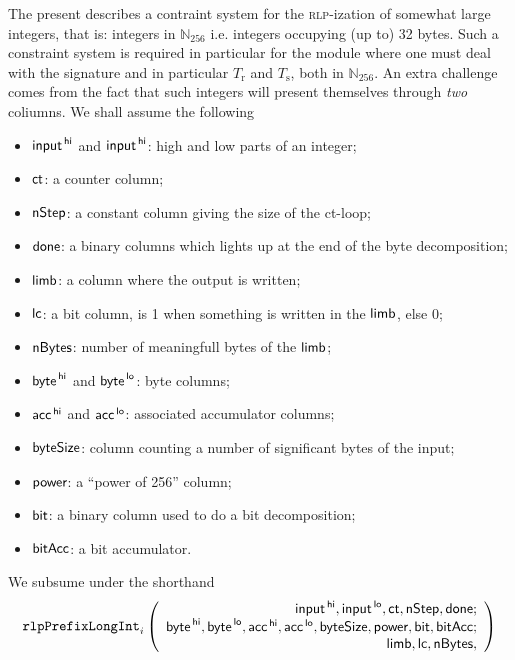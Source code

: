The present describes a contraint system for the \textsc{rlp}-ization of somewhat large integers, that is: integers in $\mathbb{N}_{256}$ i.e. integers occupying (up to) 32 bytes. Such a constraint system is required in particular for the \rlpTxnMod{} module where one must deal with the signature and in particular $T_\text{r}$ and $T_\text{s}$, both in $\mathbb{N}_{256}$. An extra challenge comes from the fact that such integers will present themselves through \emph{two} coliumns. We shall assume the following
\begin{itemize}
    \item $\textsf{input} ^{\mathsf{\,hi}}$ and $\textsf{input} ^{\mathsf{\,hi}}$: high and low parts of an integer;
    \item $\textsf{ct}$: a counter column;
    \item $\textsf{nStep}$: a constant column giving the size of the ct-loop;
    \item $\textsf{done}$: a binary columns which lights up at the end of the byte decomposition;
    \item $\textsf{limb}$: a column where the output is written;
    \item $\textsf{lc}$: a bit column, is 1 when something is written in the $\textsf{limb}$, else 0;
    \item $\textsf{nBytes}$: number of meaningfull bytes of the $\textsf{limb}$;
    \item $\textsf{byte} ^{\mathsf{\,hi}}$ and $\textsf{byte} ^{\mathsf{\,lo}}$: byte columns;
    \item $\textsf{acc} ^{\mathsf{\,hi}}$ and $\textsf{acc} ^{\mathsf{\,lo}}$: associated accumulator columns; 
    \item $\textsf{byteSize}$: column counting a number of significant bytes of the input;
    \item $\textsf{power}$: a ``power of 256'' column;
    \item $\textsf{bit}$: a binary column used to do a bit decomposition;
    \item $\textsf{bitAcc}$: a bit accumulator.
\end{itemize}

\noindent We subsume under the shorthand
\[
    \texttt{rlpPrefixLongInt}_{i}
    \left(
    \begin{array}{r}
        \textsf{input}^{\mathsf{\,hi}},
        \textsf{input}^{\mathsf{\,lo}},
        \textsf{ct},
        \textsf{nStep},
        \textsf{done};\\
        \textsf{byte}^{\mathsf{\,hi}},
        \textsf{byte}^{\mathsf{\,lo}},
        \textsf{acc}^{\mathsf{\,hi}},
        \textsf{acc}^{\mathsf{\,lo}},
        \textsf{byteSize},
        \textsf{power},
        \textsf{bit},
        \textsf{bitAcc}; \\
        \textsf{limb},
        \textsf{lc},
        \textsf{nBytes},
    \end{array}
    \right)
\]

